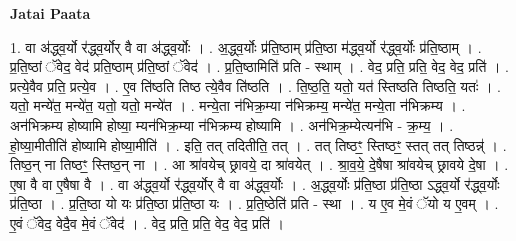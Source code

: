 \documentclass[17pt]{extarticle}
\begin{document}
\textbf{Jatai Paata} \newline

1. वा अ॑द्ध्व॒र्यो र॑द्ध्व॒र्योर् वै वा अ॑द्ध्व॒र्योः । . अ॒द्ध्व॒र्योः प्र॑ति॒ष्ठाम् प्र॑ति॒ष्ठा म॑द्ध्व॒र्यो र॑द्ध्व॒र्योः प्र॑ति॒ष्ठाम् । . प्र॒ति॒ष्ठां ॅवेद॒ वेद॑ प्रति॒ष्ठाम् प्र॑ति॒ष्ठां ॅवेद॑ । . प्र॒ति॒ष्ठामिति॑ प्रति - स्थाम् । . वेद॒ प्रति॒ प्रति॒ वेद॒ वेद॒ प्रति॑ । . प्रत्ये॒वैव प्रति॒ प्रत्ये॒व । . ए॒व ति॑ष्ठति तिष्ठ त्ये॒वैव ति॑ष्ठति । . ति॒ष्ठ॒ति॒ यतो॒ यत॑ स्तिष्ठति तिष्ठति॒ यतः॑ । . यतो॒ मन्ये॑त॒ मन्ये॑त॒ यतो॒ यतो॒ मन्ये॑त । . मन्ये॒ता न॑भिक्र॒म्या न॑भिक्रम्य॒ मन्ये॑त॒ मन्ये॒ता न॑भिक्रम्य । . अन॑भिक्रम्य होष्यामि होष्या॒ म्यन॑भिक्र॒म्या न॑भिक्रम्य होष्यामि । . अन॑भिक्र॒म्येत्यन॑भि - क्र॒म्य॒ । . हो॒ष्या॒मीतीति॑ होष्यामि होष्या॒मीति॑ । . इति॒ तत् तदितीति॒ तत् । . तत् तिष्ठꣳ॒॒ स्तिष्ठꣳ॒॒ स्तत् तत् तिष्ठन्न्॑ । . तिष्ठ॒न् ना तिष्ठꣳ॒॒ स्तिष्ठ॒न् ना । . आ श्रा॑वयेच् छ्रावये॒ दा श्रा॑वयेत् । . श्रा॒व॒ये॒ दे॒षैषा श्रा॑वयेच् छ्रावये दे॒षा । . ए॒षा वै वा ए॒षैषा वै । . वा अ॑द्ध्व॒र्यो र॑द्ध्व॒र्योर् वै वा अ॑द्ध्व॒र्योः । . अ॒द्ध्व॒र्योः प्र॑ति॒ष्ठा प्र॑ति॒ष्ठा ऽद्ध्व॒र्यो र॑द्ध्व॒र्योः प्र॑ति॒ष्ठा । . प्र॒ति॒ष्ठा यो यः प्र॑ति॒ष्ठा प्र॑ति॒ष्ठा यः । . प्र॒ति॒ष्ठेति॑ प्रति - स्था । . य ए॒व मे॒वं ॅयो य ए॒वम् । . ए॒वं ॅवेद॒ वेदै॒व मे॒वं ॅवेद॑ । . वेद॒ प्रति॒ प्रति॒ वेद॒ वेद॒ प्रति॑ । \newline
\end{document}
